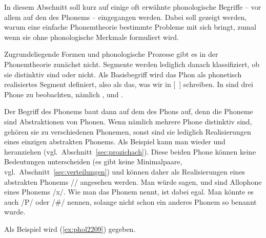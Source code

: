 \label{sec:phonphonem}

In diesem Abschnitt soll kurz auf einige oft erwähnte phonologische Begriffe -- vor allem auf den des Phonems -- eingegangen werden.
Dabei soll gezeigt werden, warum eine einfache Phonemtheorie bestimmte Probleme mit sich bringt, zumal wenn sie ohne phonologische Merkmale formuliert wird.

Zugrundeliegende Formen und phonologische Prozesse gibt es in der Phonemtheorie zunächst nicht.
Segmente werden lediglich danach klassifiziert, ob sie distinktiv sind oder nicht.
Als Basisbegriff wird das Phon als phonetisch realisiertes Segment definiert, also als das, was wir in [~] schreiben.
In \textipa{[ta:k]} sind drei Phone zu beobachten, nämlich \textipa{[t]}, \textipa{[a:]} und \textipa{[k]}.


Der Begriff des Phonems baut dann auf dem des Phons auf, denn die Phoneme sind Abstraktionen von Phonen.
Wenn nämlich mehrere Phone distinktiv sind, gehören sie zu verschiedenen Phonemen, sonst sind sie lediglich Realisierungen eines einzigen abstrakten Phonems.
Als Beispiel kann man wieder \textipa{[\c{c}]} und \textipa{[X]} heranziehen (vgl.\ Abschnitt~\ref{sec:prozichach}).
Diese beiden Phone können keine Bedeutungen unterscheiden (es gibt keine Minimalpaare, vgl.\ Abschnitt~\ref{sec:verteilungen}) und können daher als Realisierungen eines abstrakten Phonems // angesehen werden.
Man würde sagen, \textipa{[\c{c}]} und \textipa{[X]} sind Allophone eines Phonems /x/.
Wie man das Phonem nennt, ist dabei egal.
Man könnte es auch /P/ oder /\#/ nennen, solange nicht schon ein anderes Phonem so benannt wurde.


Als Beispiel wird (\ref{ex:phol2209}) gegeben.

\begin{exe}
  \ex\label{ex:phol2209}
  \begin{xlist}
  \end{xlist}
\end{exe}

